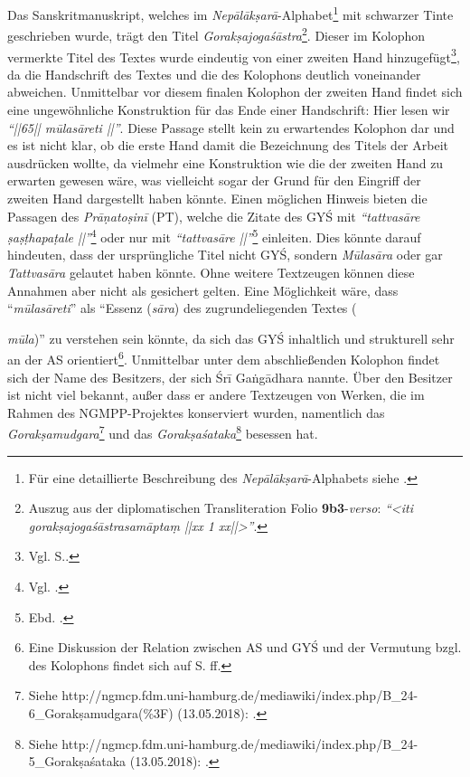 \documentclass[a4paper,12pt]{article}
\begin{document}
Das Sanskritmanuskript, welches im \textit{Nepālākṣarā}-Alphabet\footnote{Für eine detaillierte Beschreibung des \textit{Nepālākṣarā}-Alphabets siehe \parencite[xvii-xxv]{lienhard1988}.} mit schwarzer Tinte geschrieben wurde, trägt den Titel \textit{Gorakṣajogaśāstra}\footnote{Auszug aus der diplomatischen Transliteration Folio \textbf{9b3}-\textit{verso}: \textit{``<iti gorakṣajogaśāstrasamāptaṃ ||xx 1 xx||>''}.}. Dieser im Kolophon vermerkte Titel des Textes wurde eindeutig von einer zweiten Hand hinzugefügt\footnote{Vgl. S.\pageref{lastleave}.}, da die Handschrift des Textes und die des Kolophons deutlich voneinander abweichen. Unmittelbar vor diesem finalen Kolophon der zweiten Hand findet sich eine ungewöhnliche Konstruktion für das Ende einer Handschrift: Hier lesen wir \textit{``||65|| mūlasāreti ||''}. Diese Passage stellt kein zu erwartendes Kolophon dar und es ist nicht klar, ob die erste Hand damit die Bezeichnung des Titels der Arbeit ausdrücken wollte, da vielmehr eine Konstruktion wie die der zweiten Hand zu erwarten gewesen wäre, was vielleicht sogar der Grund für den Eingriff der zweiten Hand dargestellt haben könnte. Einen möglichen Hinweis bieten die Passagen des \textit{Prāṇatoṣinī} (PT), welche die Zitate des GYŚ mit \textit{``tattvasāre ṣaṣṭhapaṭale ||''}\footnote{Vgl. \parencite[84]{ramatosana}.} oder nur mit \textit{``tattvasāre ||''}\footnote{Ebd. \parencite[85]{ramatosana}.} einleiten. Dies könnte darauf hindeuten, dass der ursprüngliche Titel nicht GYŚ, sondern \textit{Mūlasāra} oder gar \textit{Tattvasāra} gelautet haben könnte. Ohne weitere Textzeugen können diese Annahmen aber nicht als gesichert gelten. Eine Möglichkeit wäre, dass ``\textit{mūlasāreti}'' als ``Essenz (\textit{sāra}) des zugrundeliegenden Textes ({\textit{mūla})'' zu verstehen sein könnte, da sich das GYŚ inhaltlich und strukturell sehr an der AS orientiert\footnote{Eine Diskussion der Relation zwischen AS und GYŚ und der Vermutung bzgl. des Kolophons findet sich auf S.\pageref{mulariddle} ff.}. Unmittelbar unter dem abschließenden Kolophon findet sich der Name des Besitzers, der sich Śrī Gaṅgādhara nannte. Über den Besitzer ist nicht viel bekannt, außer dass er andere Textzeugen von Werken, die im Rahmen des NGMPP-Projektes konserviert wurden, namentlich  das \textit{Gorakṣamudgara}\footnote{\raggedright{Siehe http://ngmcp.fdm.uni-hamburg.de/mediawiki/index.php/B\_24-6\_Gorakṣamudgara(\%3F) (13.05.2018): \textcite{gmudgara}.}} und das \textit{Gorakṣaśataka}\footnote{\raggedright{Siehe http://ngmcp.fdm.uni-hamburg.de/mediawiki/index.php/B\_24-5\_Gorakṣaśataka (13.05.2018): \textcite{gsataka}.}} besessen hat.  

}
\end{document}

